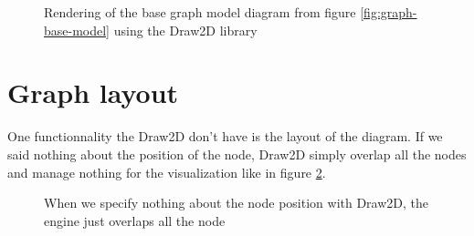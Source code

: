 \begin{figure}[h]
  \centering
  \caption[Render of the base graph model using the Draw2D library]{Rendering of the base graph model diagram from figure \ref{fig:graph-base-model} using the Draw2D library}
  \label{fig:base-graph-model-html-draw2d}
\end{figure}



\section{Graph layout}
\label{sec:graph-layout}

One functionnality the Draw2D don't have is the layout of the diagram. If we said nothing about the position of the node, Draw2D simply overlap all the nodes and manage nothing for the visualization like in figure \ref{fig:draw2d_overlapping}.

\begin{figure}
  \centering
  \caption[Overlapping of nodes by Draw2D]{When we specify nothing about the node position with Draw2D, the engine just overlaps all the node}
  \label{fig:draw2d_overlapping}
\end{figure}

